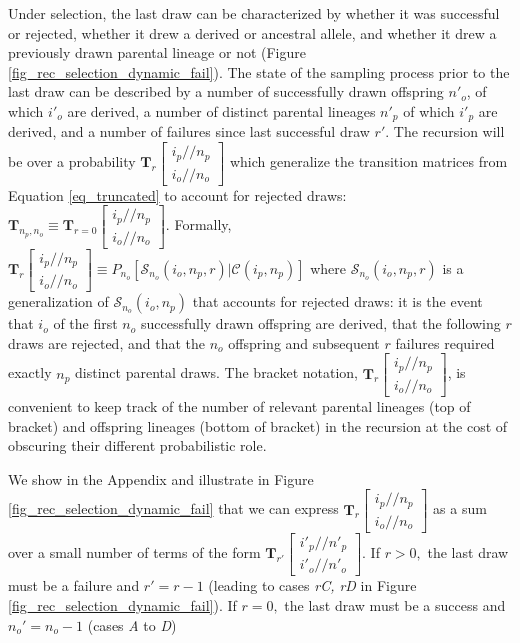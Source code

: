 \documentclass[review,nonatbib]{elsarticle}
\newcommand{\dslash}{/\!\!/}
\newcommand{\Coalc}[4]{\begin{bmatrix}#1\dslash #2 \\ #3\dslash #4 \end{bmatrix}}
\newcommand{\ms}{\mathcal{S}}
\begin{document}
Under selection, the last draw can be characterized by whether it was successful or rejected, whether it drew a
derived or ancestral allele, and whether it drew a previously drawn parental lineage or not (Figure \ref{fig_rec_selection_dynamic_fail}).
The state of the sampling process prior to the last draw can be described by a number of successfully drawn
offspring $n'_o$, of which $i'_o$ are derived, a number of distinct parental lineages
$n'_p$ of which $i'_p$ are derived, and a number of failures since last successful draw $r'$.
The recursion will be over a probability $\mathbf{T}_{r}\Coalc{i_p}{n_p}{i_o}{n_o}$ which generalize the 
transition matrices from Equation \eqref{eq_truncated} to account for rejected draws: $\mathbf{T}_{n_p,n_o}\equiv \mathbf{T}_{r=0}\Coalc{i_p}{n_p}{i_o}{n_o}.$    
Formally,  $\mathbf{T}_{r}\Coalc{i_p}{n_p}{i_o}{n_o} \equiv P_{n_o}\left[\ms_{n_o}(i_o, n_p, r) | \mathcal{C}(i_p, n_p)\right]$ where
$\ms_{n_o}(i_o, n_p, r)$ is a generalization of  $\ms_{n_o}(i_o, n_p)$ that accounts for rejected draws: 
it is the event that $i_o$ of the
first $n_o$ successfully drawn offspring are derived, that the following $r$ draws are rejected, and
that the $n_o$ offspring and subsequent $r$ failures required exactly $n_p$ distinct parental draws.
The bracket notation, $\mathbf{T}_{r}\Coalc{i_p}{n_p}{i_o}{n_o}$, 
is convenient to keep track of the number of relevant parental lineages (top of bracket) and offspring lineages (bottom of bracket) 
in the recursion at the cost of obscuring their different probabilistic role.


We show in the Appendix and illustrate in Figure \ref{fig_rec_selection_dynamic_fail}  that we
can express $\mathbf{T}_{r}\Coalc{i_p}{n_p}{i_o}{n_o}$ as a sum over a small number of terms
of the form $\mathbf{T}_{r'}\Coalc{i'_p}{n'_p}{i'_o}{n'_o}.$ If $r>0,$ the last draw must be a failure
and $r' = r - 1$ (leading to cases \textit{rC, rD} in Figure \ref{fig_rec_selection_dynamic_fail}).
If $r=0,$ the last draw must be a success and $n_o' = n_o-1$ (cases \textit{A} to \textit{D})

\end{document}
